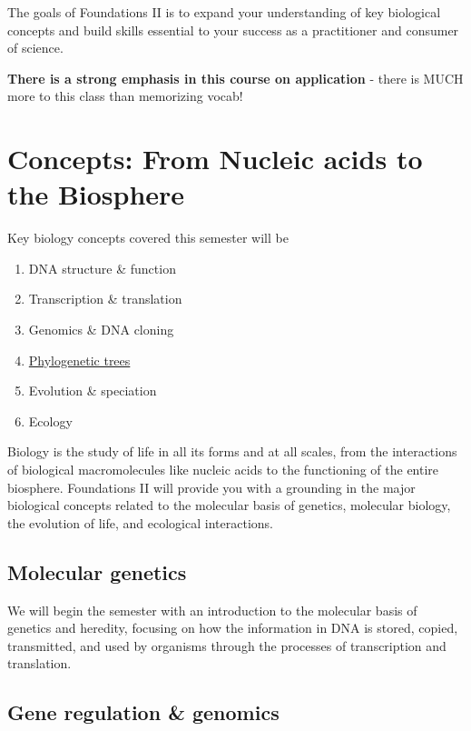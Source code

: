 \documentclass[
]{book}
\providecommand{\tightlist}{%
  \setlength{\itemsep}{0pt}\setlength{\parskip}{0pt}}
\begin{document}
The goals of Foundations II is to expand your understanding of key biological concepts and build skills essential to your success as a practitioner and consumer of science.

\textbf{There is a strong emphasis in this course on application} - there is MUCH more to this class than memorizing vocab!

\hypertarget{concepts-from-nucleic-acids-to-the-biosphere}{%
\section{Concepts: From Nucleic acids to the Biosphere}\label{concepts-from-nucleic-acids-to-the-biosphere}}

Key biology concepts covered this semester will be

\begin{enumerate}
\def\labelenumi{\arabic{enumi}.}
\tightlist
\item
  DNA structure \& function
\item
  Transcription \& translation
\item
  Genomics \& DNA cloning
\item
  \href{https://en.wikipedia.org/wiki/Phylogenetic_tree}{Phylogenetic trees}
\item
  Evolution \& speciation
\item
  Ecology
\end{enumerate}

Biology is the study of life in all its forms and at all scales, from the interactions of biological macromolecules like nucleic acids to the functioning of the entire biosphere. Foundations II will provide you with a grounding in the major biological concepts related to the molecular basis of genetics, molecular biology, the evolution of life, and ecological interactions.

\hypertarget{molecular-genetics}{%
\subsection{Molecular genetics}\label{molecular-genetics}}

We will begin the semester with an introduction to the molecular basis of genetics and heredity, focusing on how the information in DNA is stored, copied, transmitted, and used by organisms through the processes of transcription and translation.

\hypertarget{gene-regulation-genomics}{%
\subsection{Gene regulation \& genomics}\label{gene-regulation-genomics}}
\end{document}
